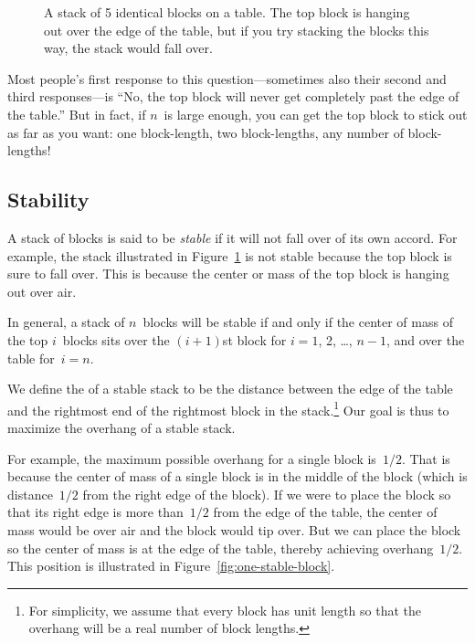 \begin{figure}



\caption{A stack of 5 identical blocks on a table.  The top block is
  hanging out over the edge of the table, but if you try stacking the
  blocks this way, the stack would fall over.}

\label{fig:9G11}

\end{figure}

Most people's first response to this question---sometimes also their
second and third responses---is ``No, the top block will never get
completely past the edge of the table.''  But in fact, if $n$~is large
enough, you can get the top block to stick out as far as you want: one
block-length, two block-lengths, any number of block-lengths!

\subsection{Stability}\label{sec:stability}

A stack of blocks is said to be \emph{stable} if it will not fall over
of its own accord.  For example, the stack illustrated in
Figure~\ref{fig:9G11} is not stable because the top block is sure to
fall over.  This is because the center or mass of the top block is
hanging out over air.

In general, a stack of $n$~blocks will be stable if and only if the
center of mass of the top $i$~blocks sits over the $(i + 1)$st block
for $i = 1$, 2, \dots, $n - 1$, and over the table for~$i = n$.

We define the  of a stable stack to be the distance
between the edge of the table and the rightmost end of the rightmost
block in the stack.\footnote{For simplicity, we assume that every
  block has unit length so that the overhang will be a real number of
  block lengths.}  Our goal is thus to maximize the overhang of a
stable stack.

For example, the maximum possible overhang for a single block
is~$1/2$.  That is because the center of mass of a single block is in
the middle of the block (which is distance~$1/2$ from the right edge
of the block).  If we were to place the block so that its right edge
is more than~$1/2$ from the edge of the table, the center of mass
would be over air and the block would tip over.  But we can place the
block so the center of mass is at the edge of the table, thereby
achieving overhang~$1/2$.  This position is illustrated in
Figure~\ref{fig:one-stable-block}.

